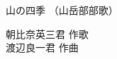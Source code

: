 \documentclass[10pt,b5j]{tarticle} %
\begin{document}
\begin{minipage}[c]{0.7\hsize} %
    \begin{center}
        {\LARGE
            山の四季 %
        }
        {\small 
            （山岳部部歌） %
        }
    \end{center}
\end{minipage}
\begin{minipage}[c]{0.3\hsize} %
    \begin{flushright} %
        朝比奈英三君 作歌\\渡辺良一君 作曲 %
    \end{flushright}
\end{minipage}
\end{document}
